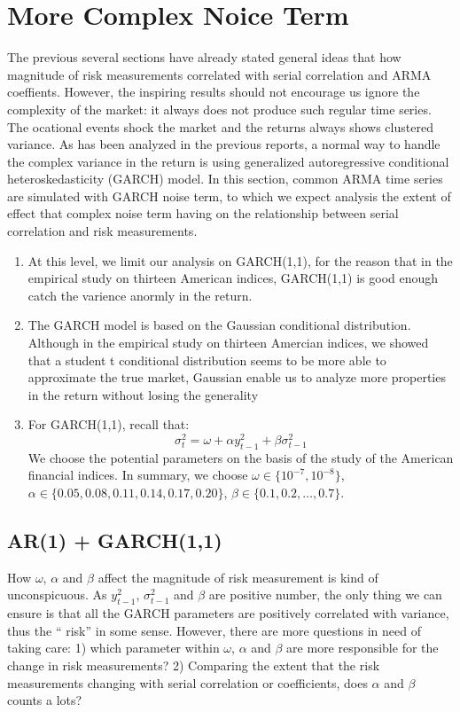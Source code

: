 \documentclass[11pt]{article}
\begin{document}
\section{More Complex Noice Term}  %
The previous several sections have already stated general ideas that how magnitude of risk measurements correlated with serial correlation and ARMA coeffients. However, the inspiring results should not encourage us ignore the complexity of the market: it always does not produce such regular time series. The ocational events shock the market and the returns always shows clustered variance. As has been analyzed in the previous reports, a normal way to handle the complex variance in the return is using generalized autoregressive conditional heteroskedasticity (GARCH) model. In this section, common ARMA time series are simulated with GARCH noise term, to which we expect analysis the extent of effect that complex noise term having on the relationship between serial correlation and risk measurements.

\begin{enumerate}
\item At this level, we limit our analysis on GARCH(1,1), for the reason that in the empirical study on thirteen American indices, GARCH(1,1) is good enough catch the varience anormly in the return.
\item The GARCH model is based on the Gaussian conditional distribution. Although in the empirical study on thirteen Amercian indices, we showed that a student t conditional distribution seems to be more able to approximate the true market, Gaussian enable us to analyze more properties in the return without losing the generality
\item For GARCH(1,1), recall  that:
\[
\sigma^2_t = \omega + \alpha y_{t-1}^2 + \beta \sigma^2_{t-1}
\]
 We choose the potential parameters on the basis of  the study of the American financial indices. In summary, we choose $\omega \in \{10^{-7}, 10^{-8}\}$, $\alpha \in \{0.05, 0.08, 0.11, 0.14, 0.17, 0.20\}$, $\beta  \in \{0.1,0.2,\dots, 0.7\}$.
\end{enumerate}

\subsection{AR(1) + GARCH(1,1)}
How $\omega$, $\alpha$ and $\beta$ affect the magnitude of risk measurement is kind of unconspicuous. As $y_{t-1}^2$, $\sigma_{t-1}^2$ and $\beta$ are positive number, the only thing we can ensure is that all the GARCH parameters are positively correlated with variance, thus the `` risk'' in some sense. However, there are more questions in need of taking care: 1) which parameter within $\omega$, $\alpha$ and $\beta$ are more responsible for the change in risk measurements? 2) Comparing the extent that the risk measurements changing with serial correlation or coefficients, does $\alpha$ and $\beta$ counts a lots?
\end{document}
